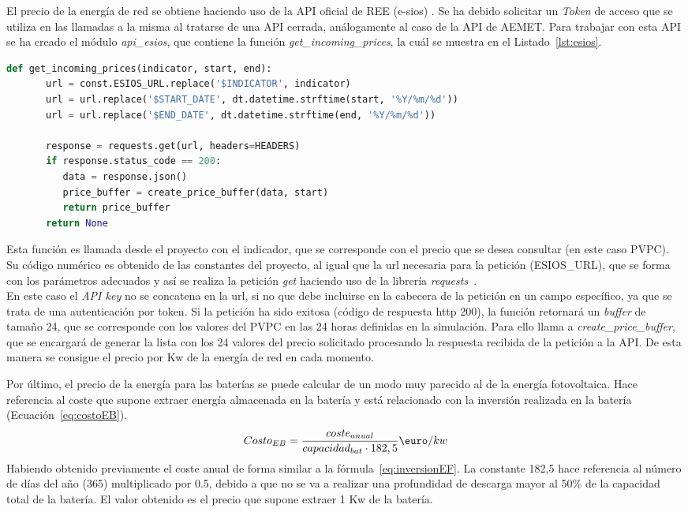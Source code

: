 	El precio de la energía de red se obtiene haciendo uso de la \gls{API} oficial de \gls{REE} (e-sios) \cite{Ree}. Se ha debido solicitar un \textit{Token} de acceso que se utiliza en las llamadas a la misma al tratarse de una \gls{API} cerrada, análogamente al caso de la \gls{API} de AEMET. Para trabajar con esta \gls{API} se ha creado el módulo \textit{api\_esios}, que contiene la función \textit{get\_incoming\_prices}, la cuál se muestra en el Listado~\ref{lst:esios}.

	\begin{lstlisting}[language=Python,float=ht,caption={Función para obtener el precio del mercado eléctrico},label={lst:esios}]
	def get_incoming_prices(indicator, start, end):
	   url = const.ESIOS_URL.replace('$INDICATOR', indicator)
	   url = url.replace('$START_DATE', dt.datetime.strftime(start, '%Y/%m/%d'))
	   url = url.replace('$END_DATE', dt.datetime.strftime(end, '%Y/%m/%d'))

	   response = requests.get(url, headers=HEADERS)
	   if response.status_code == 200:
	      data = response.json()
	      price_buffer = create_price_buffer(data, start)
	      return price_buffer
	   return None
	\end{lstlisting}

	Esta función es llamada desde el proyecto con el indicador, que se corresponde con el precio que se desea consultar (en este caso \gls{PVPC}). Su código numérico es obtenido de las constantes del proyecto, al igual que la url necesaria para la petición (ESIOS\_URL), que se forma con los parámetros adecuados y así se realiza la petición \textit{get} haciendo uso de la librería \textit{requests}~\cite{Kenn11}.\\En este caso el \textit{\gls{API} key} no se concatena en la url, si no que debe incluirse en la cabecera de la petición en un campo específico, ya que se trata de una autenticación por token. Si la petición ha sido exitosa (código de respuesta http 200), la función retornará un \textit{buffer} de tamaño 24, que se corresponde con los valores del \gls{PVPC} en las 24 horas definidas en la simulación. Para ello llama a \textit{create\_price\_buffer}, que se encargará de generar la lista con los 24 valores del precio solicitado procesando la respuesta recibida de la petición a la \gls{API}.
	De esta manera se consigue el precio por Kw de la energía de red en cada momento.

	Por último, el precio de la energía para las baterías se puede calcular de un modo muy parecido al de la energía fotovoltaica. Hace referencia al coste que supone extraer energía almacenada en la batería y está relacionado con la inversión realizada en la batería (Ecuación~\ref{eq:costoEB}).
	\begin{equation}
          \label{eq:costoEB}
	Costo_{EB} = \frac{coste_{anual}}{capacidad_{bat}\cdot182,5} \textup{\euro}/kw
	\end{equation}
	Habiendo obtenido previamente el coste anual de forma similar a la fórmula~\ref{eq:inversionEF}. La constante 182,5 hace referencia al número de días del año (365) multiplicado por 0.5, debido a que no se va a realizar una profundidad de descarga mayor al 50\% de la capacidad total de la batería. El valor obtenido es el precio que supone extraer 1 Kw de la batería.

